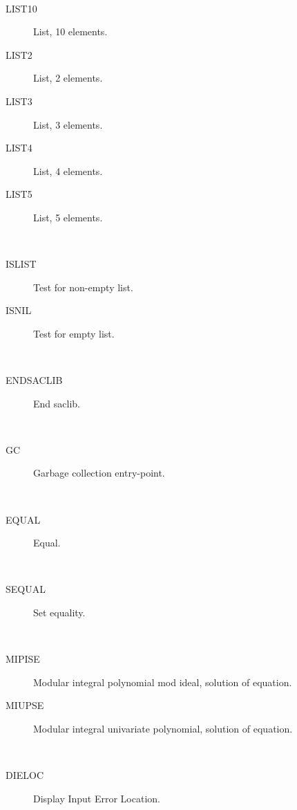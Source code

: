 \begin{description}
\begin{description}
  \end{description}
\item[elements] \ \ 
  \begin{description}
  \item[LIST10]  List, 10 elements.
  \item[LIST2]  List, 2 elements.
  \item[LIST3]  List, 3 elements.
  \item[LIST4]  List, 4 elements.
  \item[LIST5]  List, 5 elements.
  \end{description}
\item[empty] \ \ 
  \begin{description}
  \item[ISLIST]  Test for non-empty list.
  \item[ISNIL]  Test for empty list.
  \end{description}
\item[end] \ \ 
  \begin{description}
  \item[ENDSACLIB]  End saclib.
  \end{description}
\item[entry] \ \ 
  \begin{description}
  \item[GC]  Garbage collection entry-point.
  \end{description}
\item[equal] \ \ 
  \begin{description}
  \item[EQUAL]  Equal.
  \end{description}
\item[equality] \ \ 
  \begin{description}
  \item[SEQUAL]  Set equality.
  \end{description}
\item[equation] \ \ 
  \begin{description}
  \item[MIPISE]  Modular integral polynomial mod ideal, solution of equation.
  \item[MIUPSE]  Modular integral univariate polynomial, solution of equation.
  \end{description}
\item[error] \ \ 
  \begin{description}
  \item[DIELOC]  Display Input Error Location.
  \end{description}

\end{description}
